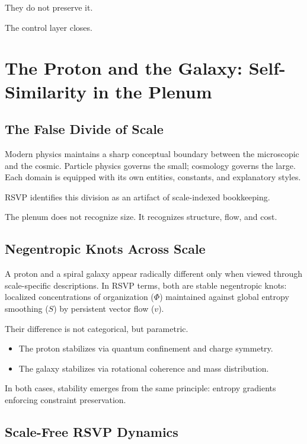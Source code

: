 \documentclass[11pt]{book}
\begin{document}
They do not preserve it.

The control layer closes.


\chapter{The Proton and the Galaxy: Self-Similarity in the Plenum}

\section{The False Divide of Scale}

Modern physics maintains a sharp conceptual boundary between the microscopic and the cosmic. Particle physics governs the small; cosmology governs the large. Each domain is equipped with its own entities, constants, and explanatory styles.

RSVP identifies this division as an artifact of scale-indexed bookkeeping.

The plenum does not recognize size. It recognizes structure, flow, and cost.

\section{Negentropic Knots Across Scale}

A proton and a spiral galaxy appear radically different only when viewed through scale-specific descriptions. In RSVP terms, both are stable negentropic knots: localized concentrations of organization (\(\Phi\)) maintained against global entropy smoothing (\(S\)) by persistent vector flow (\(v\)).

Their difference is not categorical, but parametric.

\begin{itemize}
\item The proton stabilizes via quantum confinement and charge symmetry.
\item The galaxy stabilizes via rotational coherence and mass distribution.
\end{itemize}

In both cases, stability emerges from the same principle: entropy gradients enforcing constraint preservation.

\section{Scale-Free RSVP Dynamics}
\end{document}
